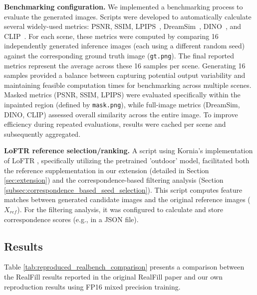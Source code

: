 \documentclass{article}
\begin{document}
\textbf{Benchmarking configuration.} We implemented a benchmarking process to evaluate the generated images. Scripts were developed to automatically calculate several widely-used metrics: PSNR, SSIM, LPIPS~\cite{zhang2018unreasonable}, DreamSim~\cite{fu2023dreamsim}, DINO~\cite{caron2021emerging}, and CLIP~\cite{radford2021clip}. For each scene, these metrics were computed by comparing 16 independently generated inference images (each using a different random seed) against the corresponding ground truth image (\texttt{gt.png}). The final reported metrics represent the average across these 16 samples per scene. Generating 16 samples provided a balance between capturing potential output variability and maintaining feasible computation times for benchmarking across multiple scenes. Masked metrics (PSNR, SSIM, LPIPS) were evaluated specifically within the inpainted region (defined by \texttt{mask.png}), while full-image metrics (DreamSim, DINO, CLIP) assessed overall similarity across the entire image. To improve efficiency during repeated evaluations, results were cached per scene and subsequently aggregated.

\textbf{LoFTR reference selection/ranking.} A script using Kornia's implementation of LoFTR \cite{sun2021loftr}, specifically utilizing the pretrained 'outdoor' model, facilitated both the reference supplementation in our extension (detailed in Section \ref{sec:extension}) and the correspondence-based filtering analysis (Section \ref{subsec:correspondence_based_seed_selection}). This script computes feature matches between generated candidate images and the original reference images ($X_{ref}$). For the filtering analysis, it was configured to calculate and store correspondence scores (e.g., in a JSON file).

\subsection{Results}
\label{subsec:reproduction_results}

Table \ref{tab:reproduced_realbench_comparison} presents a comparison between the RealFill results reported in the original RealFill paper and our own reproduction results using FP16 mixed precision training.
\end{document}
